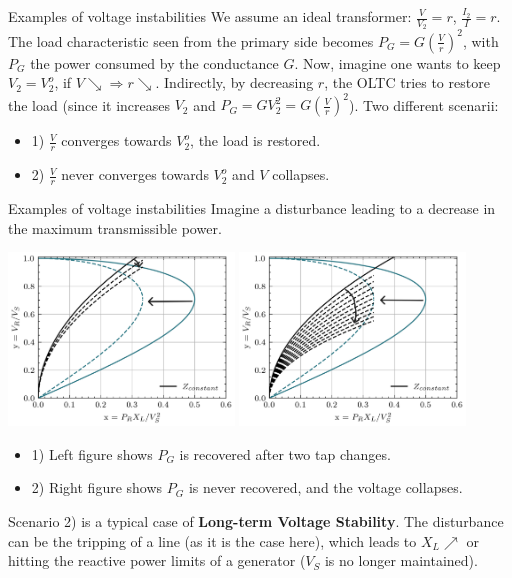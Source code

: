 \begin{frame}{Examples of voltage instabilities}
We assume an ideal transformer: $\frac{V}{V_2} = r$, $\frac{I_2}{I} = r$.
The load characteristic seen from the primary side becomes $P_G = G\left(\frac{V}{r}\right)^2$, with $P_G$ the power consumed by the conductance $G$.
Now, imagine one wants to keep $V_2 = V_2^o$, if $V \searrow \Rightarrow r \searrow$. Indirectly, by decreasing $r$, the OLTC tries to restore the load (since it increases $V_2$ and $P_G = G V_2^2 = G\left(\frac{V}{r}\right)^2$).
Two different scenarii:
\begin{itemize}
    \item 1) $\frac{V}{r}$ converges towards $V_2^o$, the load is restored.
    \item 2) $\frac{V}{r}$ never converges towards $V_2^o$ and $V$ collapses.
\end{itemize}
\end{frame}

\begin{frame}{Examples of voltage instabilities}
Imagine a disturbance leading to a decrease in the maximum transmissible power.
\begin{center}
\includegraphics[width=0.45\textwidth]{images/PVcurvestable.png}
\includegraphics[width=0.45\textwidth]{images/PVcurveunstable.png}
\end{center}
\begin{itemize}
    \item 1) Left figure shows $P_G$ is recovered after two tap changes.
    \item 2) Right figure shows $P_G$ is never recovered, and the voltage collapses.
\end{itemize}
Scenario 2) is a typical case of \textbf{Long-term Voltage Stability}.
The disturbance can be the tripping of a line (as it is the case here), which leads to $X_L \nearrow$ or hitting the reactive power limits of a generator ($V_S$ is no longer maintained).
\end{frame}

